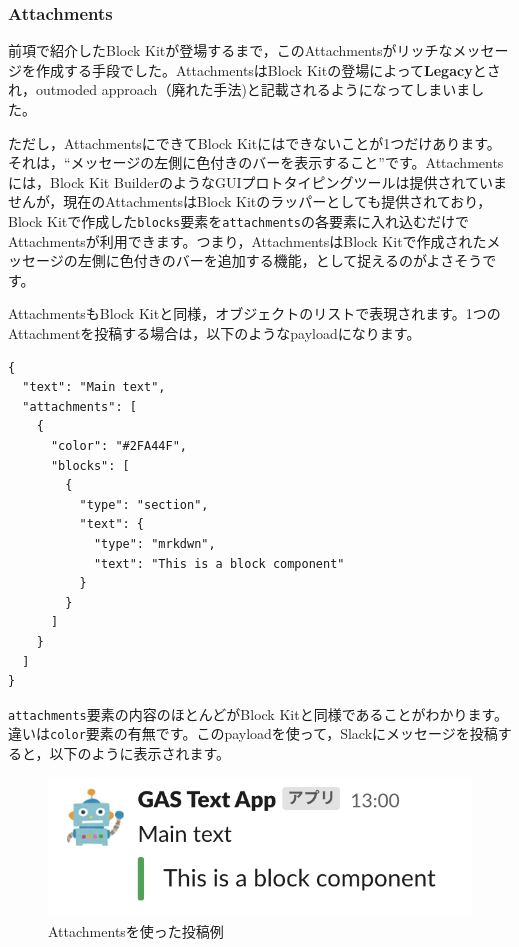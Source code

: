 \documentclass[uplatex,a4j]{jsarticle}
\begin{document}
\subsubsection{Attachments}

前項で紹介したBlock Kitが登場するまで，このAttachmentsがリッチなメッセージを作成する手段でした。AttachmentsはBlock Kitの登場によって\textbf{Legacy}とされ，outmoded approach（廃れた手法)と記載されるようになってしまいました。

ただし，AttachmentsにできてBlock Kitにはできないことが1つだけあります。それは，``メッセージの左側に色付きのバーを表示すること''です。Attachmentsには，Block Kit BuilderのようなGUIプロトタイピングツールは提供されていませんが，現在のAttachmentsはBlock Kitのラッパーとしても提供されており，Block Kitで作成した\verb|blocks|要素を\verb|attachments|の各要素に入れ込むだけでAttachmentsが利用できます。つまり，AttachmentsはBlock Kitで作成されたメッセージの左側に色付きのバーを追加する機能，として捉えるのがよさそうです。

AttachmentsもBlock Kitと同様，オブジェクトのリストで表現されます。1つのAttachmentを投稿する場合は，以下のようなpayloadになります。

\begin{lstlisting}[basicstyle=\ttfamily\footnotesize,frame=single,caption=Attachments payload sample]
{
  "text": "Main text",
  "attachments": [
    {
      "color": "#2FA44F",
      "blocks": [
        {
          "type": "section",
          "text": {
            "type": "mrkdwn",
            "text": "This is a block component"
          }
        }
      ]
    }
  ]
}
\end{lstlisting}

\verb|attachments|要素の内容のほとんどがBlock Kitと同様であることがわかります。違いは\verb|color|要素の有無です。このpayloadを使って，Slackにメッセージを投稿すると，以下のように表示されます。

\begin{figure}[H]
 \centering
 \includegraphics[keepaspectratio, scale=0.8]{images/attachments_sample.png}
 \caption{Attachmentsを使った投稿例}
 \label{fig:attachments_sample}
\end{figure}
\end{document}
